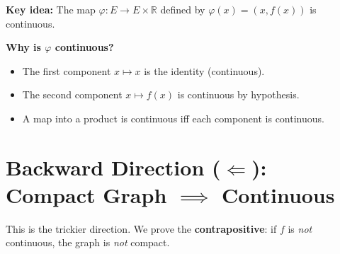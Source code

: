 \documentclass[12pt]{article}
\newcommand{\R}{\mathbb{R}}
\begin{document}
\textbf{Key idea:} The map $\varphi: E \to E \times \R$ defined by $\varphi(x) = (x, f(x))$ is continuous.

\begin{center}
\end{center}

\textbf{Why is $\varphi$ continuous?}
\begin{itemize}
    \item The first component $x \mapsto x$ is the identity (continuous).
    \item The second component $x \mapsto f(x)$ is continuous by hypothesis.
    \item A map into a product is continuous iff each component is continuous.
\end{itemize}

\section{Backward Direction ($\Leftarrow$): Compact Graph $\implies$ Continuous}

This is the trickier direction. We prove the \textbf{contrapositive}: if $f$ is \emph{not} continuous, the graph is \emph{not} compact.
\end{document}
